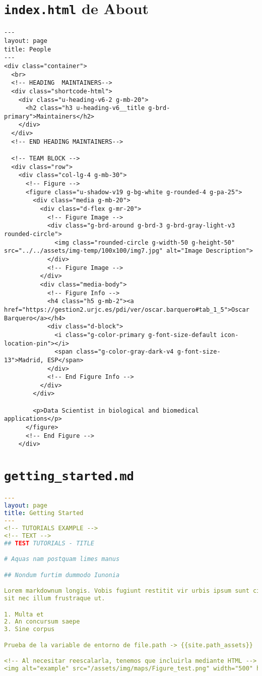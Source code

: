 \section{\texttt{index.html} de About}
\begin{lstlisting}[style=htmlcssjs,caption=index.html de About,label={code:about}]
---
layout: page
title: People
---
<div class="container">
  <br>
  <!-- HEADING  MAINTAINERS-->
  <div class="shortcode-html">
    <div class="u-heading-v6-2 g-mb-20">
      <h2 class="h3 u-heading-v6__title g-brd-primary">Maintainers</h2>
    </div>
  </div>
  <!-- END HEADING MAINTAINERS-->

  <!-- TEAM BLOCK -->
  <div class="row">
    <div class="col-lg-4 g-mb-30">
      <!-- Figure -->
      <figure class="u-shadow-v19 g-bg-white g-rounded-4 g-pa-25">
        <div class="media g-mb-20">
          <div class="d-flex g-mr-20">
            <!-- Figure Image -->
            <div class="g-brd-around g-brd-3 g-brd-gray-light-v3 rounded-circle">
              <img class="rounded-circle g-width-50 g-height-50" src="../../assets/img-temp/100x100/img7.jpg" alt="Image Description">
            </div>
            <!-- Figure Image -->
          </div>
          <div class="media-body">
            <!-- Figure Info -->
            <h4 class="h5 g-mb-2"><a href="https://gestion2.urjc.es/pdi/ver/oscar.barquero#tab_1_5">Oscar Barquero</a></h4>
            <div class="d-block">
              <i class="g-color-primary g-font-size-default icon-location-pin"></i>
              <span class="g-color-gray-dark-v4 g-font-size-13">Madrid, ESP</span>
            </div>
            <!-- End Figure Info -->
          </div>
        </div>

        <p>Data Scientist in biological and biomedical applications</p>
      </figure>
      <!-- End Figure -->
    </div>
\end{lstlisting}


\section{\texttt{getting\_started.md}}
\begin{lstlisting}[language=yaml,caption=getting\_started.md,label={code:gettingMark}]
  ---
layout: page
title: Getting Started
---
<!-- TUTORIALS EXAMPLE -->
<!-- TEXT -->
## TEST TUTORIALS - TITLE

# Aquas nam postquam limes manus

## Nondum furtim dummodo Iunonia

Lorem markdownum longis. Vobis fugiunt restitit vir urbis ipsum sunt circuiere
sit nec illum frustraque ut.

1. Multa et
2. An concursum saepe
3. Sine corpus

Prueba de la variable de entorno de file.path -> {{site.path_assets}}

<!-- Al necesitar reescalarla, tenemos que incluirla mediante HTML -->
<img alt="example" src="/assets/img/maps/Figure_test.png" width="500" height="200">
\end{lstlisting}

